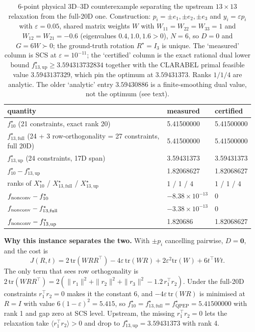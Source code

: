\begin{table}[t]
\centering
\caption{6-point physical 3D--3D counterexample separating the upstream $13\times13$ relaxation from the full-20D one. Construction: $p_i=\pm e_1,\pm e_2,\pm e_3$ and $y_i=\varepsilon p_i$ with $\varepsilon=0.05$, shared matrix weights $W$ with $W_{11}=W_{22}=W_{33}=1$ and $W_{12}=W_{21}=-0.6$ (eigenvalues $0.4,1.0,1.6>0$), $N=6$, so $D=0$ and $G=6W\succ0$; the ground-truth rotation $R^\star=I_3$ is unique. The `measured' column is SCS at $\varepsilon=10^{-11}$; the `certified' column is the exact rational dual lower bound $f^\star_{13,\mathrm{up}}\ge3.594313732834$ together with the CLARABEL primal feasible value $3.5943137329$, which pin the optimum at $3.59431373$. Ranks $1/1/4$ are analytic. The older `analytic' entry $3.59430886$ is a finite-smoothing dual value, not the optimum (see text).}
\label{tab:6point}
\scriptsize
\setlength{\tabcolsep}{3pt}
\begin{tabular}{@{}p{4.1cm} l l@{}}
\toprule
quantity & measured & certified\\
\midrule
$f^\star_{10}$ (21 constraints, exact rank 20) & 5.41500000 & 5.41500000\\
$f^\star_{13,\mathrm{full}}$ (24 + 3 row-orthogonality = 27 constraints, full 20D) & 5.41500000 & 5.41500000\\
$f^\star_{13,\mathrm{up}}$ (24 constraints, 17D span) & 3.59431373 & 3.59431373\\
$f^\star_{10}-f^\star_{13,\mathrm{up}}$ & 1.82068627 & 1.82068627\\
ranks of $X^\star_{10}$ / $X^\star_{13,\mathrm{full}}$ / $X^\star_{13,\mathrm{up}}$ & 1 / 1 / 4 & 1 / 1 / 4\\
$f_{\rm nonconv}-f^\star_{10}$ & $-8.38\times10^{-13}$ & 0\\
$f_{\rm nonconv}-f^\star_{13,\mathrm{full}}$ & $-3.38\times10^{-13}$ & 0\\
$f_{\rm nonconv}-f^\star_{13,\mathrm{up}}$ & 1.820686 & 1.82068627\\
\bottomrule
\end{tabular}
\end{table}

\textbf{Why this instance separates the two.} With $\pm p_i$ cancelling pairwise, $D=\mathbf{0}$, and the cost is
\begin{equation}
J(R,t)=2\,\mathrm{tr}(WRR^\top)-4\varepsilon\,\mathrm{tr}(WR)+2\varepsilon^2\mathrm{tr}(W)+6t^\top Wt .
\label{eq:sixpoint}
\end{equation}
The only term that sees row orthogonality is $2\,\mathrm{tr}(WRR^\top)=2(\|r_1\|^2+\|r_2\|^2+\|r_3\|^2-1.2\,r_1^\top r_2)$. Under the full-20D constraints $r_1^\top r_2=0$ makes it the constant $6$, and $-4\varepsilon\,\mathrm{tr}(WR)$ is minimised at $R=I$ with value $6(1-\varepsilon)^2=5.415$, so $f^\star_{10}=f^\star_{13,\mathrm{full}}=f^\star_{\mathrm{QPEP}}=5.41500000$ with rank 1 and gap zero at SCS level. Upstream, the missing $r_1^\top r_2=0$ lets the relaxation take $\langle r_1^\top r_2\rangle>0$ and drop to $f^\star_{13,\mathrm{up}}=3.59431373$ with rank 4.

